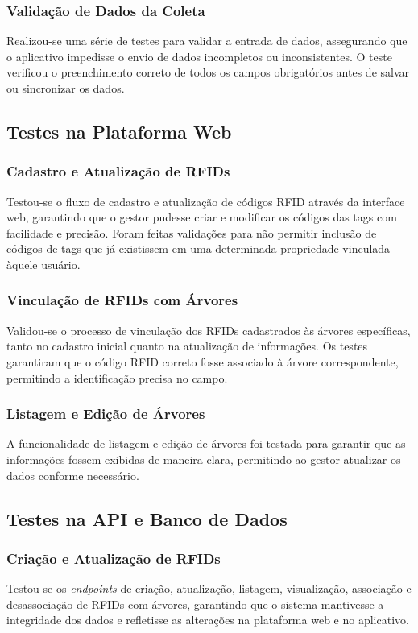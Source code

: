 \subsubsection{Validação de Dados da Coleta}
Realizou-se uma série de testes para validar a entrada de dados, assegurando que o aplicativo impedisse o envio de dados incompletos ou inconsistentes. O teste verificou o preenchimento correto de todos os campos obrigatórios antes de salvar ou sincronizar os dados.

\subsection{Testes na Plataforma Web}
\subsubsection{Cadastro e Atualização de RFIDs}
Testou-se o fluxo de cadastro e atualização de códigos RFID através da interface web, garantindo que o gestor pudesse criar e modificar os códigos das tags com facilidade e precisão. Foram feitas validações para não permitir inclusão de códigos de tags que já existissem em uma determinada propriedade vinculada àquele usuário.

\subsubsection{Vinculação de RFIDs com Árvores}
Validou-se o processo de vinculação dos RFIDs cadastrados às árvores específicas, tanto no cadastro inicial quanto na atualização de informações. Os testes garantiram que o código RFID correto fosse associado à árvore correspondente, permitindo a identificação precisa no campo.

\subsubsection{Listagem e Edição de Árvores}
A funcionalidade de listagem e edição de árvores foi testada para garantir que as informações fossem exibidas de maneira clara, permitindo ao gestor atualizar os dados conforme necessário.

\subsection{Testes na API e Banco de Dados}
\subsubsection{Criação e Atualização de RFIDs}
Testou-se os \textit{endpoints} de criação, atualização, listagem, visualização, associação e desassociação de RFIDs com árvores, garantindo que o sistema mantivesse a integridade dos dados e refletisse as alterações na plataforma web e no aplicativo.

